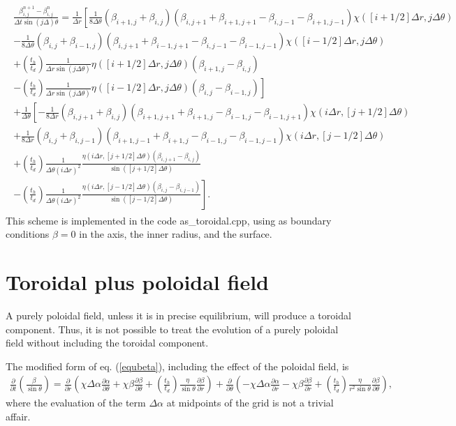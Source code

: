 \documentclass[letterpaper,10pt]{article}
\newcommand{\pp}{\partial}
\newcommand{\D}{\displaystyle}
\begin{document}
\begin{eqnarray}
\begin{aligned}
\frac{\beta_{i,j}^{n+1}-\beta_{i,j}^{n}}{\Delta t\sin (j\Delta)\theta}=\D\frac{1}{\Delta r}\left[\frac{1}{8\Delta\theta}(\beta_{i+1,j}+\beta_{i,j})(\beta_{i,j+1}+\beta_{i+1,j+1}-\beta_{i,j-1}-\beta_{i+1,j-1})\chi([i+1/2]\Delta r,j\Delta\theta)\right.\\
\left.-\frac{1}{8\Delta\theta}(\beta_{i,j}+\beta_{i-1,j})(\beta_{i,j+1}+\beta_{i-1,j+1}-\beta_{i,j-1}-\beta_{i-1,j-1})\chi([i-1/2]\Delta r,j\Delta\theta)\right.\\
+\left.\left(\frac{t_h}{t_d}\right)\frac{1}{\Delta r\sin(j\Delta\theta)}\eta([i+1/2]\Delta r,j\Delta\theta)(\beta_{i+1,j}-\beta_{i,j})\right.\\
\left.-\left(\frac{t_h}{t_d}\right)\frac{1}{\Delta r\sin(j\Delta\theta)}\eta([i-1/2]\Delta r,j\Delta\theta)(\beta_{i,j}-\beta_{i-1,j})\right]\\
+\frac{1}{\Delta \theta}\left[-\frac{1}{8\Delta r}(\beta_{i,j+1}+\beta_{i,j})(\beta_{i+1,j+1}+\beta_{i+1,j}-\beta_{i-1,j}-\beta_{i-1,j+1})\chi(i\Delta r,[j+1/2]\Delta\theta)\right.\\
\left.+\frac{1}{8\Delta r}(\beta_{i,j}+\beta_{i,j-1})(\beta_{i+1,j-1}+\beta_{i+1,j}-\beta_{i-1,j}-\beta_{i-1,j-1})\chi(i\Delta r,[j-1/2]\Delta\theta)\right.\\
+\left.\left(\frac{t_h}{t_d}\right)\frac{1}{\Delta \theta(i\Delta r)^2}\frac{\eta(i\Delta r,[j+1/2]\Delta\theta)(\beta_{i,j+1}-\beta_{i,j})}{\sin([j+1/2]\Delta\theta)}\right.\\
\left.-\left(\frac{t_h}{t_d}\right)\frac{1}{\Delta \theta(i\Delta r)^2}\frac{\eta(i\Delta r,[j-1/2]\Delta\theta)(\beta_{i,j}-\beta_{i,j-1})}{\sin([j-1/2]\Delta\theta)}\right].
\end{aligned}
\end{eqnarray}
This scheme is implemented in the code as\_toroidal.cpp, using as boundary conditions $\beta=0$ in the axis, the inner radius, and the surface.
\section{Toroidal plus poloidal field}
A purely poloidal field, unless it is in precise equilibrium, will produce a toroidal component. Thus, it is not possible to treat the evolution of a purely poloidal field without including the toroidal component.

The modified form of eq. (\ref{equbeta}), including the effect of the poloidal field, is
\begin{eqnarray}
\frac{\pp}{\pp t}\left(\frac{\beta}{\sin\theta}\right)=\frac{\pp}{\pp r}\left(\chi\Delta\alpha\frac{\pp\alpha}{\pp\theta}+\chi\beta\frac{\pp \beta}{\pp\theta}+\left(\frac{t_h}{t_d}\right)\frac{\eta}{\sin\theta}\frac{\pp\beta}{\pp r}\right)+\frac{\pp}{\pp\theta}\left(-\chi\Delta\alpha\frac{\pp\alpha}{\pp r}-\chi\beta\frac{\pp\beta}{\pp r}+\left(\frac{t_h}{t_d}\right)\frac{\eta}{r^2\sin\theta}\frac{\pp\beta}{\pp\theta}\right),
\end{eqnarray}
where the evaluation of the term $\Delta\alpha$ at midpoints of the grid is not a trivial affair.
\end{document}
